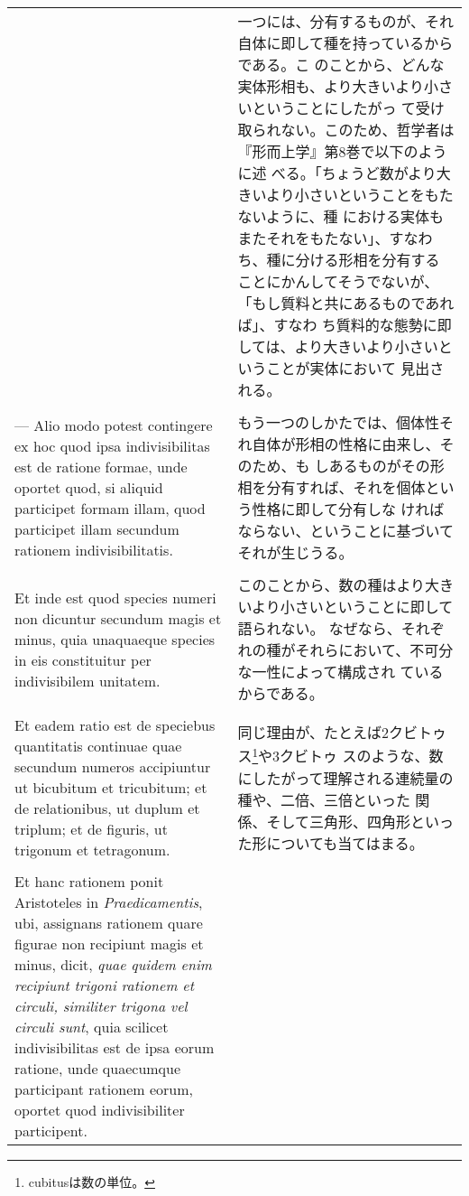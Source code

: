 \documentclass[10pt]{jsarticle} %
\begin{document}
\begin{longtable}{p{21em}p{21em}}
&

一つには、分有するものが、それ自体に即して種を持っているからである。こ
のことから、どんな実体形相も、より大きいより小さいということにしたがっ
て受け取られない。このため、哲学者は『形而上学』第8巻で以下のように述
べる。「ちょうど数がより大きいより小さいということをもたないように、種
における実体もまたそれをもたない」、すなわち、種に分ける形相を分有する
ことにかんしてそうでないが、「もし質料と共にあるものであれば」、すなわ
ち質料的な態勢に即しては、より大きいより小さいということが実体において
見出される。

\\\\


--- Alio modo potest contingere ex
hoc quod ipsa indivisibilitas est de ratione formae, unde oportet
quod, si aliquid participet formam illam, quod participet illam
secundum rationem indivisibilitatis. 


&

もう一つのしかたでは、個体性それ自体が形相の性格に由来し、そのため、も
しあるものがその形相を分有すれば、それを個体という性格に即して分有しな
ければならない、ということに基づいてそれが生じうる。

\\\\


Et inde est quod species numeri
non dicuntur secundum magis et minus, quia unaquaeque species in eis
constituitur per indivisibilem unitatem. 


&

このことから、数の種はより大きいより小さいということに即して語られない。
なぜなら、それぞれの種がそれらにおいて、不可分な一性によって構成され
ているからである。

\\\\


Et eadem ratio est de
speciebus quantitatis continuae quae secundum numeros accipiuntur ut
bicubitum et tricubitum; et de relationibus, ut duplum et triplum; et
de figuris, ut trigonum et tetragonum. 


&

同じ理由が、たとえば2クビトゥス\footnote{cubitusは数の単位。}や3クビトゥ
 スのような、数にしたがって理解される連続量の種や、二倍、三倍といった
 関係、そして三角形、四角形といった形についても当てはまる。

\\\\


Et hanc rationem ponit
Aristoteles in {\itshape Praedicamentis}, ubi, assignans rationem quare figurae
non recipiunt magis et minus, dicit, {\itshape quae quidem enim recipiunt
trigoni rationem et circuli, similiter trigona vel circuli sunt}, quia
scilicet indivisibilitas est de ipsa eorum ratione, unde quaecumque
participant rationem eorum, oportet quod indivisibiliter
participent. 



\end{longtable}
\end{document}
